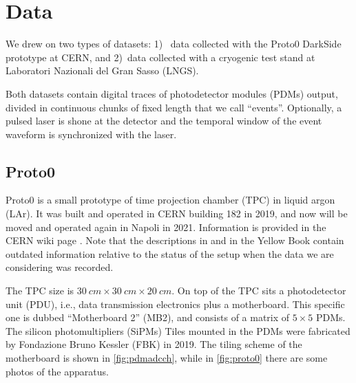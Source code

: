 \chapter{Data}
\label{ch:data}


We drew on two types of datasets: 1)~ data collected with the Proto0 DarkSide
prototype at CERN, and 2)~data collected with a cryogenic test stand at
Laboratori Nazionali del Gran Sasso (LNGS).


Both datasets contain digital traces of photodetector modules (PDMs) output,
divided in continuous chunks of fixed length that we call ``events''.
Optionally, a pulsed laser is shone at the detector and the temporal window of
the event waveform is synchronized with the laser.

\section{Proto0}
\label{sec:dataproto0}

Proto0 is a small prototype of time projection chamber (TPC) in liquid argon
(LAr). It was built and operated in CERN building 182 in 2019, and now will be
moved and operated again in Napoli in 2021. Information is provided in the CERN
wiki page \cite{proto0}. Note that the descriptions in
\cite[sec.~4.3.2]{luzzi2020} and in the Yellow Book \cite[65]{aalseth2018}
contain outdated information relative to the status of the setup when the data
we are considering was recorded.


The TPC size is $\SI{30}{cm} \times \SI{30}{cm} \times \SI{20}{cm}$. On top of
the TPC sits a photodetector unit (PDU), i.e., data transmission electronics
plus a motherboard. This specific one is dubbed ``Motherboard 2'' (MB2), and
consists of a matrix of $5\times 5$ PDMs. The silicon photomultipliers (SiPMs)
Tiles mounted in the PDMs were fabricated by Fondazione Bruno Kessler (FBK) in
2019. The tiling scheme of the motherboard is shown in \autoref{fig:pdmadcch},
while in \autoref{fig:proto0} there are some photos of the apparatus.


